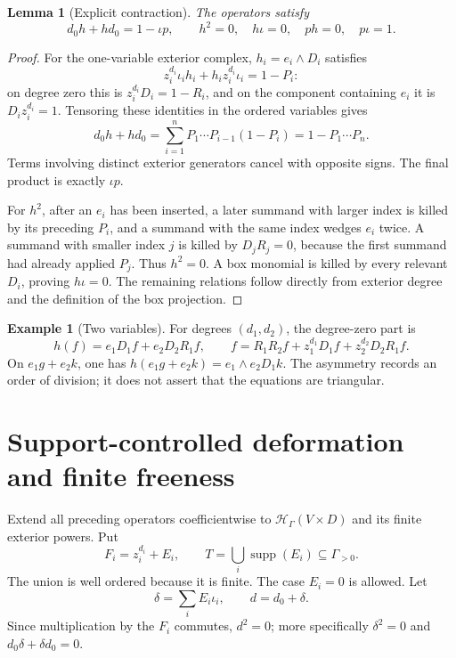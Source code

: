 \documentclass[11pt,letterpaper]{article}
\newtheorem{lemma}[theorem]{Lemma}
\theoremstyle{definition}
\newtheorem{example}[theorem]{Example}
\theoremstyle{remark}
\newcommand{\HH}{\mathcal H}
\newcommand{\supp}{\operatorname{supp}}
\numberwithin{equation}{section}
\begin{document}
\begin{lemma}[Explicit contraction]\label{lem:contraction}
The operators satisfy
\begin{equation}\label{eq:contraction}
 d_0h+hd_0=1-\iota p,\qquad
 h^2=0,\quad h\iota=0,\quad ph=0,\quad p\iota=1.
\end{equation}
\end{lemma}
\begin{proof}
For the one-variable exterior complex, $h_i=e_i\wedge D_i$ satisfies
\[
 z_i^{d_i}\iota_i h_i+h_i z_i^{d_i}\iota_i=1-P_i:
\]
on degree zero this is $z_i^{d_i}D_i=1-R_i$, and on the component containing $e_i$ it is $D_i z_i^{d_i}=1$. Tensoring these identities in the ordered variables gives
\[
 d_0h+hd_0
 =\sum_{i=1}^n P_1\cdots P_{i-1}(1-P_i)
 =1-P_1\cdots P_n.
\]
Terms involving distinct exterior generators cancel with opposite signs. The final product is exactly $\iota p$.

For $h^2$, after an $e_i$ has been inserted, a later summand with larger index is killed by its preceding $P_i$, and a summand with the same index wedges $e_i$ twice. A summand with smaller index $j$ is killed by $D_jR_j=0$, because the first summand had already applied $P_j$. Thus $h^2=0$. A box monomial is killed by every relevant $D_i$, proving $h\iota=0$. The remaining relations follow directly from exterior degree and the definition of the box projection.
\end{proof}

\begin{example}[Two variables]
For degrees $(d_1,d_2)$, the degree-zero part is
\[
 h(f)=e_1D_1f+e_2D_2R_1f,
 \qquad f=R_1R_2f+z_1^{d_1}D_1f+z_2^{d_2}D_2R_1f.
\]
On $e_1g+e_2k$, one has $h(e_1g+e_2k)=e_1\wedge e_2D_1k$. The asymmetry records an order of division; it does not assert that the equations are triangular.
\end{example}

\section{Support-controlled deformation and finite freeness}\label{sec:division}
Extend all preceding operators coefficientwise to $\HH_\Gamma(V\times D)$ and its finite exterior powers. Put
\[
 F_i=z_i^{d_i}+E_i,\qquad
 T=\bigcup_i\supp(E_i)\subseteq\Gamma_{>0}.
\]
The union is well ordered because it is finite. The case $E_i=0$ is allowed. Let
\[
 \delta=\sum_iE_i\iota_i,\qquad d=d_0+\delta.
\]
Since multiplication by the $F_i$ commutes, $d^2=0$; more specifically $\delta^2=0$ and $d_0\delta+\delta d_0=0$.
\end{document}
